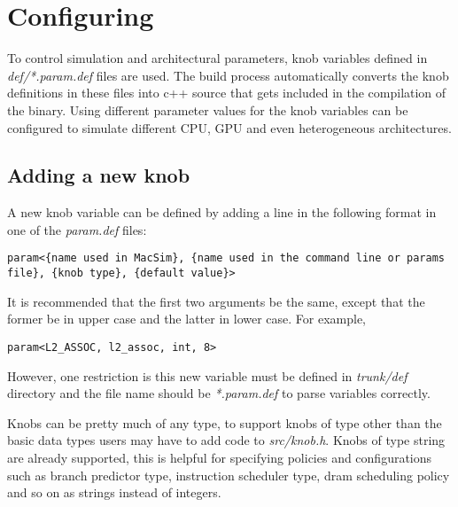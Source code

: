 \chapter{Configuring \SIM}
\label{sec:knob}


To control simulation and architectural parameters, knob variables defined 
in \textit{def/*.param.def} files are used. The build process automatically 
converts the knob definitions in these files into c++ source that gets included in 
the compilation of the \SIM binary. Using different parameter values for the knob 
variables \SIM can be configured to simulate different CPU, GPU and even 
heterogeneous architectures. 

\section{Adding a new knob}
\label{sec:knob1}

A new knob variable can be defined by adding a line in the following format in 
one of the \textit{param.def} files:

\begin{Verbatim}
param<{name used in MacSim}, {name used in the command line or params file}, {knob type}, {default value}>
\end{Verbatim}

It is recommended that the first two arguments be the same, except that the
former be in upper case and the latter in lower case. For example,

\begin{Verbatim}
param<L2_ASSOC, l2_assoc, int, 8>
\end{Verbatim}


\ignore
		{ However, one restriction is this new variable must be defined in
		\textit{trunk/def} directory and the file name should be \textit{*.param.def}
		to parse variables correctly.  }

Knobs can be pretty much of any type, to support knobs of type other than the
basic data types users may have to add code to \textit{src/knob.h}. Knobs of
type string are already supported, this is helpful for specifying policies and
configurations such as branch predictor type, instruction scheduler type, dram
scheduling policy and so on as strings instead of integers.


